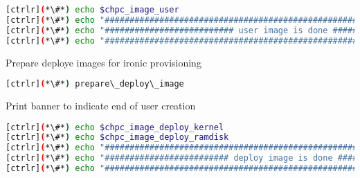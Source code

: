 \begin{lstlisting}[language=bash,keywords={},upquote=true]
[ctrlr](*\#*) echo $chpc_image_user
[ctrlr](*\#*) echo "########################################################################"
[ctrlr](*\#*) echo "########################## user image is done ##########################"
[ctrlr](*\#*) echo "########################################################################"
\end{lstlisting}

	
	Prepare deploye images for ironic provisioning 

\begin{lstlisting}[language=bash,keywords={},upquote=true]
[ctrlr](*\#*) prepare\_deploy\_image
\end{lstlisting}

	
	Print banner to indicate end of user creation

\begin{lstlisting}[language=bash,keywords={},upquote=true]
[ctrlr](*\#*) echo $chpc_image_deploy_kernel
[ctrlr](*\#*) echo $chpc_image_deploy_ramdisk
[ctrlr](*\#*) echo "########################################################################"
[ctrlr](*\#*) echo "######################### deploy image is done #########################"
[ctrlr](*\#*) echo "########################################################################"
\end{lstlisting}


